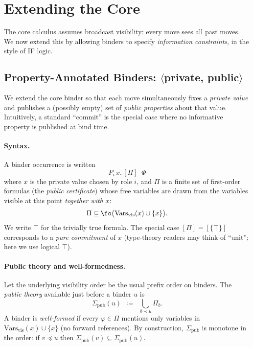 
\section{Extending the Core}
\label{sec:extensions}

The core calculus assumes broadcast visibility: every move sees all
past moves. We now extend this by allowing binders to specify
\emph{information constraints}, in the style of IF logic.

\subsection{Property-Annotated Binders: \texorpdfstring{$\langle$private, public$\rangle$}{<private, public>} }
\label{subsec:prop-annot-binders}

We extend the core binder so that each move simultaneously fixes a \emph{private
value} and publishes a (possibly empty) set of \emph{public properties} about
that value. Intuitively, a standard ``commit'' is the special case where no
informative property is published at bind time.

\paragraph{Syntax.}
A binder occurrence is written
\[
  P_i\, x.\, [\Pi] \;\; \Phi
\]
where $x$ is the private value chosen by role $i$, and $\Pi$ is a finite set of
first-order formulas (the \emph{public certificate}) whose free variables are
drawn from the variables visible at this point \emph{together with} $x$:
\[
  \Pi \subseteq \fo\big(\mathrm{Vars}_{\mathrm{vis}}(x) \cup \{x\}\big).
\]
We write $\top$ for the trivially true formula. The special case
$[\Pi]=[\{\top\}]$ corresponds to a \emph{pure commitment} of $x$ (type-theory
readers may think of ``unit''; here we use logical $\top$).

\paragraph{Public theory and well-formedness.}
Let the underlying visibility order be the usual prefix order on binders. The
\emph{public theory} available just before a binder $u$ is
\[
  \Sigma_{\mathrm{pub}}(u) \;\;\coloneqq\;\; \bigcup_{b \prec u} \Pi_b.
\]
A binder is \emph{well-formed} if every $\varphi\in\Pi$ mentions only variables
in $\mathrm{Vars}_{\mathrm{vis}}(x)\cup\{x\}$ (no forward references). By
construction, $\Sigma_{\mathrm{pub}}$ is monotone in the order: if $v\preceq u$
then $\Sigma_{\mathrm{pub}}(v)\subseteq \Sigma_{\mathrm{pub}}(u)$.

